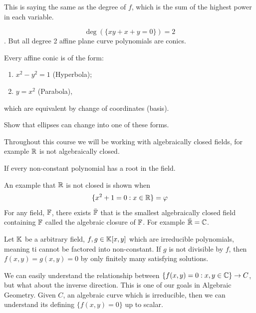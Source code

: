 \begin{definition}[Degree of $C$]
    This is saying the same as the degree of $f$, which is the sum of the highest power in each variable.
\end{definition}

\[\deg(\{xy + x + y = 0\}) = 2\].
But all degree 2 affine plane curve polynomials are conics.

\begin{lemma*}{
    Every affine conic is of the form:
    \begin{enumerate}
        \item $x^2 - y^2 = 1$ (Hyperbola);
        \item $y = x^2$ (Parabola),
    \end{enumerate}
    which are equivalent by change of coordinates (basis).
}
\end{lemma*}

\begin{problem}{
    Show that ellipses can change into one of these forms.
}

\end{problem}

Throughout this course we will be working with algebraically closed fields, for example $\mathbb{R}$ is not algebraically closed.

\begin{definition}
    If every non-constant polynomial has a root in the field.
\end{definition}

\begin{example}
    An example that $\mathbb{R}$ is not closed is shown when
    \[
    \{x^2 + 1 = 0 : x\in\mathbb{R}\} = \varphi
    \]
    For any field, $\mathbb{F}$, there exists $\bar{\mathbb{F}}$ that is the smallest algebraically closed field containing $\mathbb{F}$ called the algebraic closure of $\mathbb{F}$.
    For example $\bar{\mathbb{R}} = \mathbb{C}$.
\end{example}

\begin{proposition*}{
    Let $\mathbb{K}$ be a arbitrary field, $f,g\in\mathbb{K}[x,y]$ which are irreducible polynomials, meaning ti cannot be factored into non-constant. If $g$ is not divisible by $f$, then $f(x,y) = g(x,y) = 0$ by only finitely many satisfying solutions.
}
\end{proposition*}

We can easily understand the relationship between $\{f(x,y) = 0 : x,y\in\mathbb{C}\}\to C$, but what about the inverse direction. This is one of our goals in Algebraic Geometry. Given $C$, an algebraic curve which is irreducible, then we can understand its defining $\{f(x,y) = 0\}$ up to scalar.

